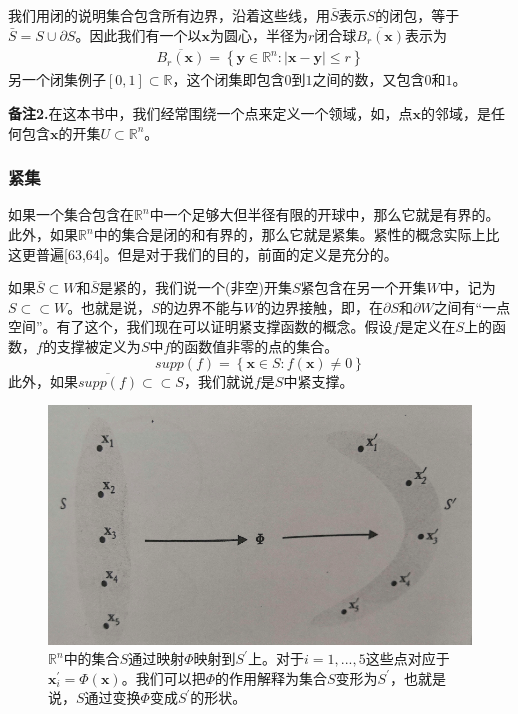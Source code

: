 我们用闭的说明集合包含所有边界，沿着这些线，用$\bar{S}$表示$S$的闭包，等于$\bar{S}=S \cup \partial S$。因此我们有一个以$\mathbf{x}$为圆心，半径为$r$闭合球$\overline{B_r(\mathbf{x})}$表示为
\begin{gather}
\overline{B_r(\mathbf{x})}=\left\{ \mathbf{y} \in \mathbb{R}^n:|\mathbf{x}- \mathbf{y}| \leq r \right\}
\end{gather}
另一个闭集例子$[0,1]\subset \mathbb{R}$，这个闭集即包含$0$到$1$之间的数，又包含$0$和$1$。

\textbf{备注2.}在这本书中，我们经常围绕一个点来定义一个领域，如，点$\mathbf{x}$的邻域，是任何包含$\mathbf{x}$的开集$U \subset \mathbb{R}^n$。

\subsubsection{紧集}
如果一个集合包含在$\mathbb{R}^n$中一个足够大但半径有限的开球中，那么它就是有界的。此外，如果$\mathbb{R}^n$中的集合是闭的和有界的，那么它就是紧集。紧性的概念实际上比这更普遍[63,64]。但是对于我们的目的，前面的定义是充分的。

如果$\bar{S} \subset W$和$\bar{S}$是紧的，我们说一个(非空)开集$S$紧包含在另一个开集$W$中，记为$S \subset \subset W$。也就是说，$S$的边界不能与$W$的边界接触，即，在$\partial S$和$\partial W$之间有“一点空间”。有了这个，我们现在可以证明紧支撑函数的概念。假设$f$是定义在$S$上的函数，$f$的支撑被定义为$S$中$f$的函数值非零的点的集合。
$$supp (f)= \left\{ \mathbf{x} \in S :f(\mathbf{x}) \neq 0 \right\}$$
此外，如果$\overline{supp (f)} \subset \subset S$，我们就说$f$是$S$中紧支撑。
\begin{figure}[H]
\centering
\includegraphics[scale=0.5]{./figures/22.png}
\caption{$\mathbb{R}^n$中的集合$S$通过映射$\Phi$映射到$S^{'}$上。对于$i=1,...,5$这些点对应于$\mathbf{x}_i^{'}=\Phi(\mathbf{x})$。我们可以把$\Phi$的作用解释为集合$S$变形为$S^{'}$，也就是说，$S$通过变换$\Phi$变成$S^{'}$的形状。}
\end{figure}

